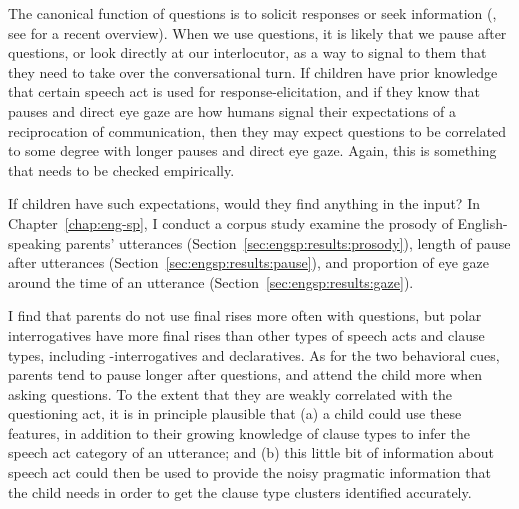 The canonical function of questions is to solicit responses or seek information (\citealt{searle1975tax,levinson1983,stivers2010}, see \citealt{krifka2011q} for a recent overview). When we use questions, it is likely that we pause after questions, or look directly at our interlocutor, as a way to signal to them that they need to take over the conversational turn. If children have prior knowledge that certain speech act is used for response-elicitation, and if they know that pauses and direct eye gaze are how humans signal their expectations of a reciprocation of communication, then they may expect questions to be correlated to some degree with longer pauses and direct eye gaze. Again, this is something that needs to be checked empirically.

If children have such expectations, would they find anything in the input? In Chapter~\ref{chap:eng-sp}, 
I conduct a corpus study examine the prosody of English-speaking parents' utterances (Section~\ref{sec:engsp:results:prosody}), length of pause after utterances (Section~\ref{sec:engsp:results:pause}), and proportion of eye gaze around the time of an utterance (Section~\ref{sec:engsp:results:gaze}). 


I find that parents do not use final rises more often with questions, but polar interrogatives have more final rises than other types of speech acts and clause types, including \twh-interrogatives and declaratives. As for the two behavioral cues, parents tend to pause longer after questions, and attend the child more when asking questions. To the extent that they are weakly correlated with the questioning act, it is in principle plausible that (a) a child could use these features, in addition to their growing knowledge of clause types to infer the speech act category of an utterance; and (b) this little bit of information about speech act could then be used to provide the noisy pragmatic information that the child needs in order to get the clause type clusters identified accurately.

 
